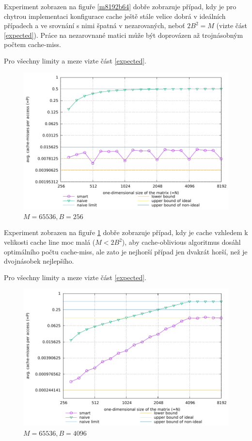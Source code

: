 \documentclass[a4paper,12pt]{article} %
\begin{document}
Experiment zobrazen na figuře \ref{m8192b64} dobře zobrazuje případ, kdy je pro chytrou implementaci konfigurace cache ještě stále velice dobrá v ideálních případech a ve srovnání s nimi špatná v nezarovaných, neboť $2B^2 = M$ (vizte část \ref{expected}). Práce na nezarovnané matici může být doprovázen až trojnásobným počtem cache-miss.

Pro všechny limity a meze vizte část \ref{expected}.

\pagebreak

\begin{figure}[!hbt]
	\caption{$M = 65536, B = 256$}
	\label{m65536b256}
	\includegraphics{sim-m65536-b256.pdf}
\end{figure}

Experiment zobrazen na figuře \ref{m65536b256} dobře zobrazuje případ, kdy je cache vzhledem k velikosti cache line moc malá ($M < 2B^2$), aby cache-oblivious algoritmus dosáhl optimálního počtu cache-miss, ale zato je nejhorší případ jen dvakrát horší, než je dvojnásobek nejlepšího.

Pro všechny limity a meze vizte část \ref{expected}.

\pagebreak

\begin{figure}[!hbt]
	\caption{$M = 65536, B = 4096$}
	\label{m65536b4096}
	\includegraphics{sim-m65536-b4096.pdf}
\end{figure}
\end{document}

